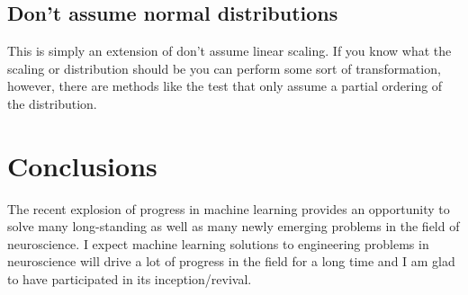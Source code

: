 \subsection{Don't assume normal distributions}
This is simply an extension of don't assume linear scaling. If you know what the scaling or distribution should be you can perform some sort of transformation, however, there are methods like the \KS test that only assume a partial ordering of the distribution.

\section{Conclusions}
The recent explosion of progress in machine learning provides an opportunity to solve many long-standing as well as many newly emerging problems in the field of neuroscience. I expect machine learning solutions to engineering problems in neuroscience will drive a lot of progress in the field for a long time and I am glad to have participated in its inception/revival.